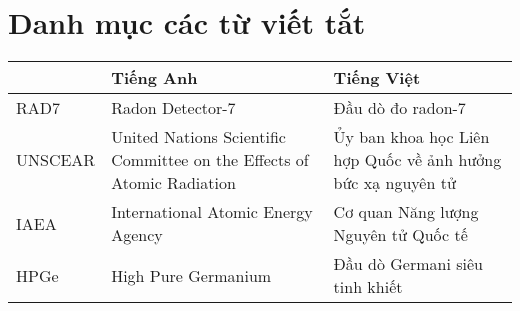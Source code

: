 \chapter*{Danh mục các từ viết tắt}


\begin {table}[!htbp]
\begin{center}
    \begin{tabular}{ >{\centering\arraybackslash}m{1.2in}  >{\centering\arraybackslash}m{2.0in} >{\centering\arraybackslash}m{2.5in} }
    \toprule[1.5pt]
    {\bf Từ viết tắt} & {\bf Tiếng Anh} & {\bf Tiếng Việt}\\ 
    \midrule

    RAD7 & Radon Detector-7    &  Đầu dò đo radon-7    \\
    UNSCEAR & United Nations Scientific Committee on the Effects of Atomic Radiation    &  Ủy ban khoa học Liên hợp Quốc về ảnh hưởng bức xạ nguyên tử   \\
   IAEA &  International Atomic Energy  Agency & Cơ quan Năng lượng Nguyên tử Quốc tế\\
   HPGe & High Pure Germanium  & Đầu dò Germani siêu tinh khiết\\
   
    \bottomrule[1.25pt]
    \end {tabular}
\end{center}
\end {table}

\clearpage